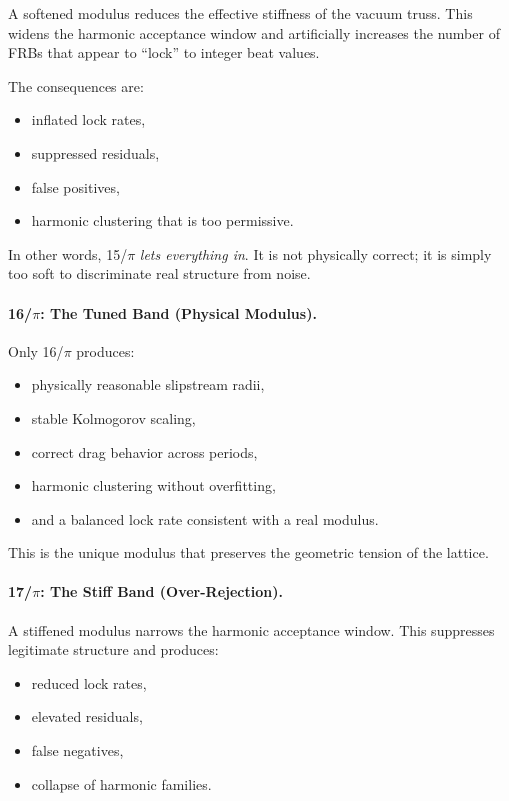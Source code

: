 \documentclass[11pt, letterpaper, openany]{book}
\begin{document}
A softened modulus reduces the effective stiffness of the vacuum truss.  
This widens the harmonic acceptance window and artificially increases the number of FRBs that
appear to ``lock'' to integer beat values.

The consequences are:

\begin{itemize}
    \item inflated lock rates,
    \item suppressed residuals,
    \item false positives,
    \item harmonic clustering that is too permissive.
\end{itemize}

In other words, 15/$\pi$ \emph{lets everything in}.  
It is not physically correct; it is simply too soft to discriminate real structure from noise.

\paragraph{16/$\pi$: The Tuned Band (Physical Modulus).}

Only 16/$\pi$ produces:

\begin{itemize}
    \item physically reasonable slipstream radii,
    \item stable Kolmogorov scaling,
    \item correct drag behavior across periods,
    \item harmonic clustering without overfitting,
    \item and a balanced lock rate consistent with a real modulus.
\end{itemize}

This is the unique modulus that preserves the geometric tension of the lattice.

\paragraph{17/$\pi$: The Stiff Band (Over-Rejection).}

A stiffened modulus narrows the harmonic acceptance window.  
This suppresses legitimate structure and produces:

\begin{itemize}
    \item reduced lock rates,
    \item elevated residuals,
    \item false negatives,
    \item collapse of harmonic families.
\end{itemize}
\end{document}
